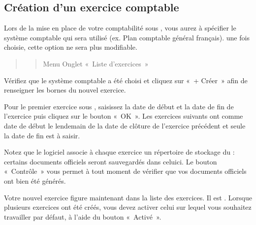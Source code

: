 \documentclass[a4paper,10pt,oneside,french]{sphinxmanual}
\begin{document}
\subsection{Création d’un exercice comptable}
\label{\detokenize{accounting/fiscalyear:creation-d-un-exercice-comptable}}
\sphinxAtStartPar
Lors de la mise en place de votre comptabilité sous , vous aurez à spécifier le système comptable qui sera utilisé (ex. Plan comptable général français).  une fois choisie, cette option ne sera plus modifiable.
\begin{quote}
\begin{quote}

\sphinxAtStartPar
Menu  \sphinxhyphen{} Onglet « Liste d’exercices »
\end{quote}

\noindent{}
\end{quote}

\sphinxAtStartPar
Vérifiez que le système comptable a été choisi et cliquez sur « + Créer » afin de renseigner les bornes du nouvel exercice.
\begin{quote}

\noindent{}
\end{quote}

\sphinxAtStartPar
Pour le premier exercice sous , saisissez la date de début et la date de fin de l’exercice puis cliquez sur le bouton « OK ». Les exercices suivants ont comme date de début le lendemain de la date de clôture de l’exercice précédent et seule la date de fin est à saisir.

\sphinxAtStartPar
Notez que le logiciel associe à chaque exercice un répertoire de stockage du  : certains documents
officiels seront sauvegardés dans celui\sphinxhyphen{}ci. Le bouton « Contrôle » vous permet à tout moment de  vérifier que vos documents officiels ont bien été générés.

\sphinxAtStartPar
Votre nouvel exercice figure maintenant dans la liste des exercices. Il est \sphinxstylestrong{{[}en création{]}}. Lorsque plusieurs exercices ont été créés, vous devez activer celui sur lequel vous souhaitez travailler par défaut, à l’aide du bouton « Activé ».
\begin{quote}

\sphinxAtStartPar
{}
\end{quote}
\end{document}
